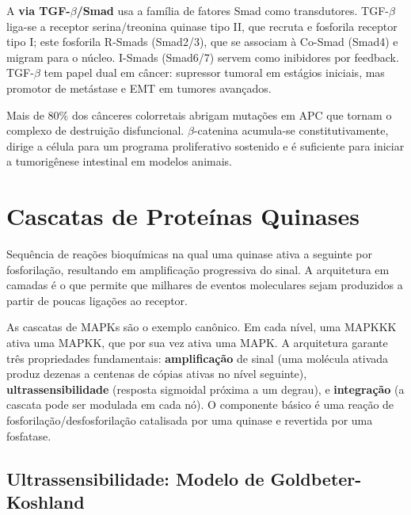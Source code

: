 A \textbf{via TGF-$\beta$/Smad} usa a família de fatores Smad como transdutores.
TGF-$\beta$ liga-se a receptor serina/treonina quinase tipo II, que recruta e
fosforila receptor tipo I; este fosforila R-Smads (Smad2/3), que se associam à
Co-Smad (Smad4) e migram para o núcleo. I-Smads (Smad6/7) servem como
inibidores por feedback. TGF-$\beta$ tem papel dual em câncer: supressor
tumoral em estágios iniciais, mas promotor de metástase e EMT em tumores
avançados.

\begin{exemploenumv}
Mais de 80\% dos cânceres colorretais abrigam mutações em APC que tornam o
complexo de destruição disfuncional. $\beta$-catenina acumula-se constitutivamente,
dirige a célula para um programa proliferativo sostenido e é suficiente para
iniciar a tumorigênese intestinal em modelos animais.
\end{exemploenumv}


\section{Cascatas de Proteínas Quinases}
\label{sec:09-cascata-quinases}

\begin{definicaoenv}
Sequência de reações bioquímicas na qual uma quinase ativa a seguinte por
fosforilação, resultando em amplificação progressiva do sinal. A arquitetura
em camadas é o que permite que milhares de eventos moleculares sejam
produzidos a partir de poucas ligações ao receptor.
\end{definicaoenv}

As cascatas de MAPKs são o exemplo canônico. Em cada nível, uma MAPKKK
ativa uma MAPKK, que por sua vez ativa uma MAPK. A arquitetura garante três
propriedades fundamentais: \textbf{amplificação} de sinal (uma molécula
ativada produz dezenas a centenas de cópias ativas no nível seguinte),
\textbf{ultrassensibilidade} (resposta sigmoidal próxima a um degrau), e
\textbf{integração} (a cascata pode ser modulada em cada nó). O componente
básico é uma reação de fosforilação/desfosforilação catalisada por uma
quinase e revertida por uma fosfatase.

\subsection{Ultrassensibilidade: Modelo de Goldbeter-Koshland}
\label{subsec:09-ultrassensibilidade}

